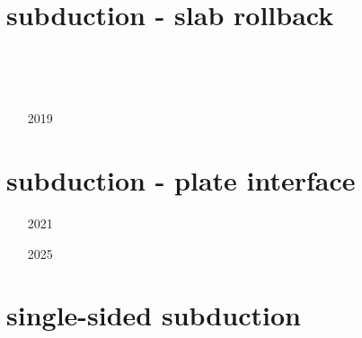 \section{subduction - slab rollback} 

\begin{small}
\begin{itemize}
\item[\twothousandthree] 
\item[\twothousandsix] 
\item[\twothousandnine] 
\item[\twothousandnine] 
\item[\twothousandtwelve] 
\item[\twothousandthirteen] 
 \\
\item[\twothousandfourteen]
 \\
\item[\twothousandfifteen]
\item[2019]
\item[\twothousandtwenty]
\end{itemize}
\end{small}





\section{subduction - plate interface} 

\begin{small}
\begin{itemize}
\item[2021]
\item[2025]
 \\
\end{itemize}
\end{small}

\section{single-sided subduction}

